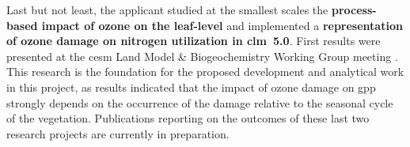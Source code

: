 Last but not least, the applicant studied at the smallest scales the \textbf{process-based impact of ozone on the leaf-level} and implemented a \textbf{representation of ozone damage on nitrogen utilization in \gls{clm}~5.0}. First results were presented at the \gls{cesm} Land Model \& Biogeochemistry Working Group meeting \parencite{CESMWP:Falk2021}. This research is the foundation for the proposed development and analytical work in this project, as results indicated that the impact of ozone damage on \gls{gpp} strongly depends on the occurrence of the damage relative to the seasonal cycle of the vegetation. Publications reporting on the outcomes of these last two research projects are currently in preparation.
